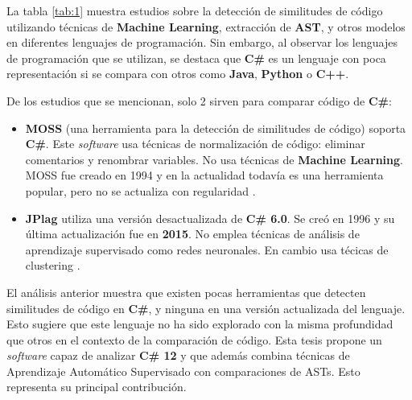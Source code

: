 La tabla \ref{tab:1} muestra estudios sobre la detección de similitudes de código utilizando técnicas de \textbf{Machine Learning}, extracción de \textbf{AST}, y otros modelos en diferentes lenguajes de programación. Sin embargo, al observar los lenguajes de programación que se utilizan, se destaca que \textbf{C\#} es un lenguaje con poca representación si se compara con otros como \textbf{Java}, \textbf{Python} o \textbf{C++}.

De los estudios que se mencionan, solo 2 sirven para comparar código de \textbf{C\#}: 
\begin{itemize}
 \item \textbf{MOSS} (una herramienta para la detección de similitudes de código) soporta \textbf{C\#}. Este \textit{software} usa técnicas de normalización de código: eliminar comentarios y renombrar variables. No usa técnicas de \textbf{Machine Learning}. MOSS fue creado en 1994 y en la actualidad todavía es una herramienta popular, pero no se actualiza con regularidad \cite{aiken1994moss}. 
 
 \item \textbf{JPlag} \cite{JPlag2025} utiliza una versión desactualizada de \textbf{C\# 6.0}. Se creó en 1996 y su última actualización fue en \textbf{2015}. No emplea técnicas de análisis de aprendizaje supervisado como redes neuronales. En cambio usa técicas de clustering \cite{JPlag2025}. 

\end{itemize}

 El análisis anterior muestra que existen pocas herramientas que detecten similitudes de código en \textbf{C\#}, y ninguna en una versión actualizada del lenguaje. Esto sugiere que este lenguaje no ha sido explorado con la misma profundidad que otros en el contexto de la comparación de código. Esta tesis propone un \textit{software} capaz de analizar \textbf{C\# 12} y que además combina técnicas de Aprendizaje Automático Supervisado con comparaciones de ASTs. Esto representa su principal contribución.
